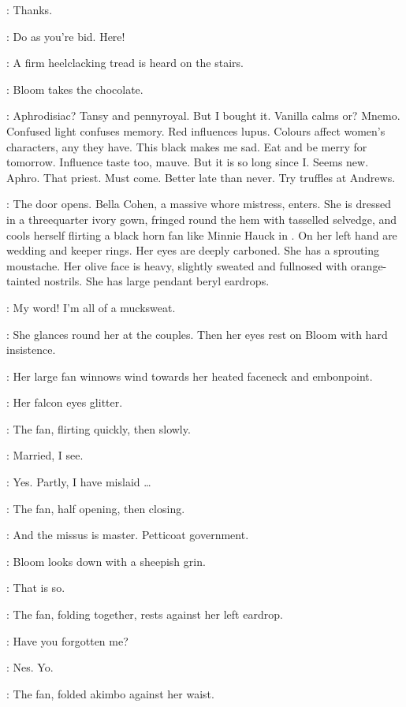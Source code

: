 \Bloom:
Thanks.

\Zoe:
Do as you're bid.
Here!

:
A firm heelclacking tread is heard on the stairs.

:
Bloom takes the chocolate.

\Bloom:
Aphrodisiac?
Tansy and pennyroyal.
But I bought it.
Vanilla calms or?
Mnemo.
Confused light confuses memory.
Red influences lupus.
Colours affect women's characters, any they have.
This black makes me sad.
Eat and be merry for tomorrow.
Influence taste too, mauve.
But it is so long since I.
Seems new.
Aphro.
That priest.
Must come.
Better late than never.
Try truffles at Andrews.

:
The door opens.
Bella Cohen, a massive whore mistress, enters.
She is dressed in a threequarter ivory gown,
fringed round the hem with tasselled selvedge,
and cools herself flirting a black horn fan like Minnie Hauck in .
On her left hand are wedding and keeper rings.
Her eyes are deeply carboned.
She has a sprouting moustache.
Her olive face is heavy, slightly sweated and fullnosed with orange-tainted nostrils.
She has large pendant beryl eardrops.

\Bella:
My word!
I'm all of a mucksweat.

:
She glances round her at the couples.
Then her eyes rest on Bloom with hard insistence.

:
Her large fan winnows wind towards her heated faceneck and embonpoint.

:
Her falcon eyes glitter.

:
The fan, flirting quickly, then slowly.

\Fan:
Married, I see.

\Bloom:
Yes.
Partly, I have mislaid \ldots

:
The fan, half opening, then closing.

\Fan:
And the missus is master.
Petticoat government.%

:
Bloom looks down with a sheepish grin.

\Bloom:
That is so.

:
The fan, folding together, rests against her left eardrop.

\Fan:
Have you forgotten me?

\Bloom:
Nes. Yo.

:
The fan, folded akimbo against her waist.


